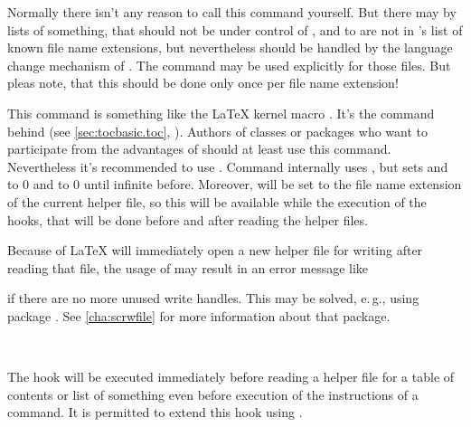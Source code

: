 Normally there isn't any reason to call this command yourself. But there may
by lists of something, that should not be under control of ,
and to are not in 's list of known file name extensions, but
nevertheless should be handled by the language change mechanism of
. The command may be used explicitly for those files. But pleas
note, that this should be done only once per file name extension!%
%

\begin{Declaration}
\end{Declaration}
This command is something like the \LaTeX{} kernel macro
.  It's the
command behind  (see \autoref{sec:tocbasic.toc},
). Authors of classes or packages
who want to participate from the advantages of  should at
least use this command. Nevertheless it's recommended to use
. Command  internally uses
\Macro{\@starttoc}, but sets
 and  to 0
and  to 0 until infinite before. Moreover,
 will be set to
the file name extension of the current helper file, so this will be available
while the execution of the hooks, that will be done before and after reading
the helper files.

Because of \LaTeX{} will immediately open a new helper
file for writing after reading that file, the usage of
 may result in an error message like
if there are no more unused write handles. This may be solved, e.\,g., using
package
.
See \autoref{cha:scrwfile} for more information about that package.%

\begin{Declaration}
  \\
\end{Declaration}
%
%
The hook  will be executed immediately before
reading a helper file for a table of contents or list of something even
before execution of the instructions of a 
command. It is permitted to extend this hook using
.

